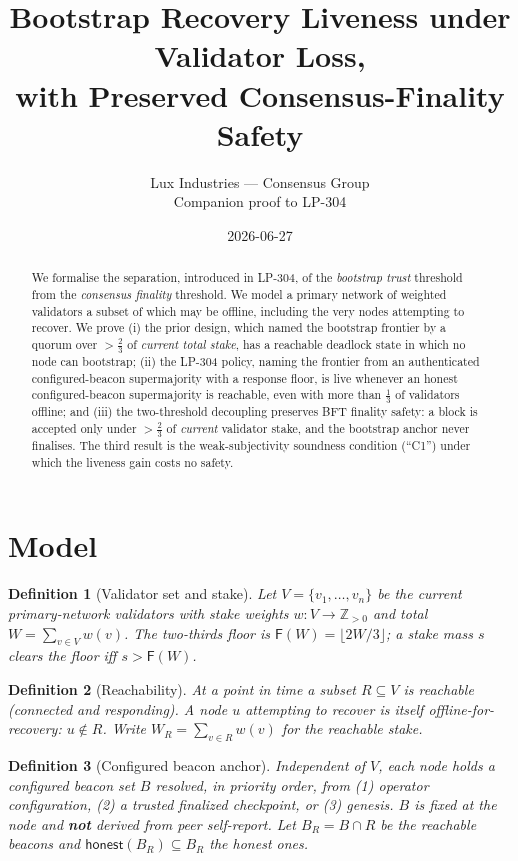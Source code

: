 \documentclass[11pt]{article}
\title{Bootstrap Recovery Liveness under Validator Loss,\\
       with Preserved Consensus-Finality Safety}
\author{Lux Industries --- Consensus Group \\ Companion proof to LP-304}
\date{2026-06-27}
\newtheorem{definition}{Definition}
\begin{document}
\maketitle

\begin{abstract}
We formalise the separation, introduced in LP-304, of the \emph{bootstrap trust} threshold
from the \emph{consensus finality} threshold. We model a primary network of weighted
validators a subset of which may be offline, including the very nodes attempting to recover.
We prove (i) the prior design, which named the bootstrap frontier by a quorum over
$>\!\tfrac23$ of \emph{current total stake}, has a reachable deadlock state in which no node
can bootstrap; (ii) the LP-304 policy, naming the frontier from an authenticated
configured-beacon supermajority with a response floor, is live whenever an honest
configured-beacon supermajority is reachable, even with more than $\tfrac13$ of validators
offline; and (iii) the two-threshold decoupling preserves BFT finality safety: a block is
accepted only under $>\!\tfrac23$ of \emph{current} validator stake, and the bootstrap anchor
never finalises. The third result is the weak-subjectivity soundness condition (``C1'')
under which the liveness gain costs no safety.
\end{abstract}

\section{Model}

\begin{definition}[Validator set and stake]
Let $V=\{v_1,\dots,v_n\}$ be the current primary-network validators with stake weights
$w:V\to\mathbb{Z}_{>0}$ and total $W=\sum_{v\in V}w(v)$. The two-thirds floor is
$\mathsf{F}(W)=\lfloor 2W/3\rfloor$; a stake mass $s$ \emph{clears} the floor iff $s>\mathsf{F}(W)$.
\end{definition}

\begin{definition}[Reachability]
At a point in time a subset $R\subseteq V$ is \emph{reachable} (connected and responding). A
node $u$ attempting to recover is itself offline-for-recovery: $u\notin R$. Write
$W_R=\sum_{v\in R}w(v)$ for the reachable stake.
\end{definition}

\begin{definition}[Configured beacon anchor]
Independent of $V$, each node holds a \emph{configured beacon set} $B$ resolved, in priority
order, from (1) operator configuration, (2) a trusted finalized checkpoint, or (3) genesis.
$B$ is fixed at the node and \textbf{not} derived from peer self-report. Let $B_R=B\cap R$ be
the reachable beacons and $\mathsf{honest}(B_R)\subseteq B_R$ the honest ones.
\end{definition}
\end{document}
